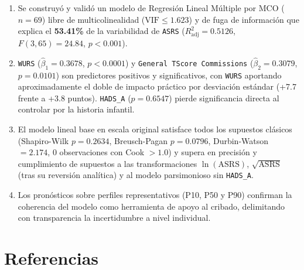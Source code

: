 \documentclass[11pt,letterpaper]{article}
\begin{document}
\begin{enumerate}
  \item Se construyó y validó un modelo de Regresión Lineal Múltiple por MCO ($n = 69$) libre de multicolinealidad ($\text{VIF} \le 1.623$) y de fuga de información que explica el \textbf{53.41\%} de la variabilidad de \texttt{ASRS} ($R^2_{\text{adj}} = 0.5126$, $F(3, 65) = 24.84$, $p < 0.001$).
  \item \texttt{WURS} ($\hat{\beta}_1 = 0.3678$, $p < 0.0001$) y \texttt{General TScore Commissions} ($\hat{\beta}_2 = 0.3079$, $p = 0.0101$) son predictores positivos y significativos, con \texttt{WURS} aportando aproximadamente el doble de impacto práctico por desviación estándar (+7.7 frente a +3.8 puntos). \texttt{HADS\_A} ($p = 0.6547$) pierde significancia directa al controlar por la historia infantil.
  \item El modelo lineal base en escala original satisface todos los supuestos clásicos (Shapiro-Wilk $p = 0.2634$, Breusch-Pagan $p = 0.0796$, Durbin-Watson $= 2.174$, 0 observaciones con Cook $> 1.0$) y supera en precisión y cumplimiento de supuestos a las transformaciones $\ln(\text{ASRS})$, $\sqrt{\text{ASRS}}$ (tras su reversión analítica) y al modelo parsimonioso sin \texttt{HADS\_A}.
  \item Los pronósticos sobre perfiles representativos (P10, P50 y P90) confirman la coherencia del modelo como herramienta de apoyo al cribado, delimitando con transparencia la incertidumbre a nivel individual.
\end{enumerate}

\section*{Referencias}
\end{document}
